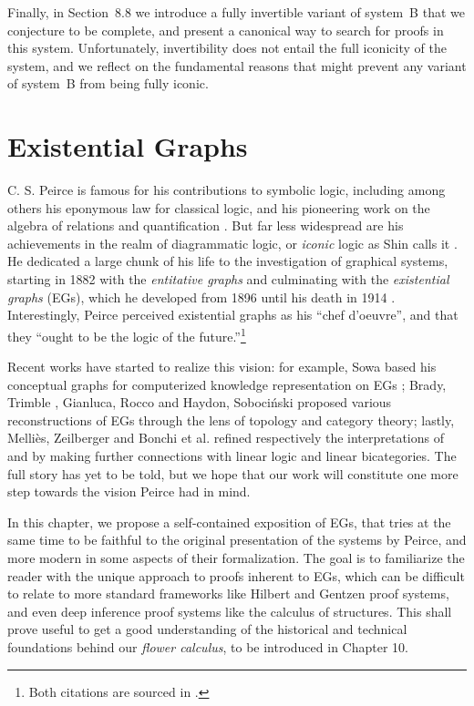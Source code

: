 \documentclass[11pt]{article}
\begin{document}
Finally, in Section~8.8 we introduce a fully invertible variant of system~B that we conjecture to be complete, and present a canonical way to search for proofs in this system. Unfortunately, invertibility does not entail the full iconicity of the system, and we reflect on the fundamental reasons that might prevent any variant of system~B from being fully iconic.

\section{Existential Graphs}

C. S. Peirce is famous for his contributions to symbolic logic, including
among others his eponymous law for classical logic, and his pioneering work
on the algebra of relations and quantification \cite{peirce_algebra_1885}. But
far less widespread are his achievements in the realm of diagrammatic
logic, or \emph{iconic} logic as Shin calls it \cite{10.7551/mitpress/3633.001.0001}. He dedicated a large chunk of his life to
the investigation of graphical systems, starting in 1882 with the
\emph{entitative graphs} and culminating with the \emph{existential
graphs} (EGs), which he developed from 1896 until his death in 1914
\cite{Roberts+1973}. Interestingly, Peirce perceived existential graphs
as his ``chef d'oeuvre'', and that they ``ought to be the logic
of the future.''\footnote{Both citations are sourced in \cite[p.~11]{Roberts+1973}.}

Recent works have started to realize this vision: for example, Sowa based his
conceptual graphs for computerized knowledge representation on EGs
\cite{sowa_conceptual_1976}; Brady, Trimble
\cite{brady_categorical_2000,brady_string_nodate}, Gianluca, Rocco
\cite{caterina_new_2020} and Haydon, Sobociński
\cite{pietarinen_compositional_2020} proposed various reconstructions of
EGs through the lens of topology and category theory; lastly,
Melliès, Zeilberger \cite{mellies_bifibrational_2016} and Bonchi et al.
\cite{bonchi_diagrammatic_2024} refined respectively the interpretations of
\cite{brady_string_nodate} and \cite{pietarinen_compositional_2020} by making
further connections with linear logic \cite{girard-linear-1987} and
linear bicategories. The full story has yet to be told, but we hope that
our work will constitute one more step towards the vision Peirce had in mind.

In this chapter, we propose a self-contained exposition of EGs, that tries
at the same time to be faithful to the original presentation of the systems by
Peirce, and more modern in some aspects of their formalization. The goal is
to familiarize the reader with the unique approach to proofs inherent to
EGs, which can be difficult to relate to more standard frameworks like
Hilbert and Gentzen proof systems, and even deep inference proof systems
like the calculus of structures. This shall prove useful to get a good
understanding of the historical and technical foundations behind our
\emph{flower calculus}, to be introduced in Chapter 10.
\\
\end{document}
